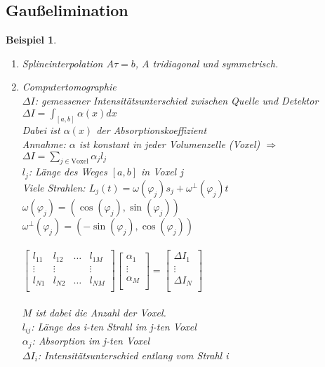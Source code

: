 \documentclass[12pt]{article}
\theoremstyle{break}
\newtheorem{example}[theorem]{Beispiel}
\begin{document}
\subsection{Gaußelimination}
%
\begin{example}\leavevmode
\begin{enumerate}
  \item[a)] Splineinterpolation $A\tau = b$, $A$ tridiagonal und symmetrisch.
  \item[b)] Computertomographie \\
    $\Delta I$: gemessener Intensitätsunterschied zwischen Quelle und Detektor \\
    $\Delta I = \int_{[a,b]} \alpha(x) dx$\\
    Dabei ist $\alpha(x)$ der Absorptionskoeffizient\\
    Annahme: $\alpha$ ist konstant in jeder Volumenzelle (Voxel) $\Rightarrow$\\
    $\Delta I = \sum_{j \in \text{Voxel}} \alpha_j l_j$\\
    $l_j$: Länge des Weges $[a,b]$ in Voxel $j$\\
    Viele Strahlen: $L_j(t) = \omega ( \varphi_j ) s_j + \omega^{\perp} ( \varphi_j ) t$\\
    $\omega(\varphi_j) = (\cos(\varphi_j), \sin(\varphi_j))$\\
    $\omega^{\perp}(\varphi_j) = (-\sin(\varphi_j), \cos(\varphi_j))$ \\\\
    $\begin{bmatrix} 
    l_{11} & l_{12} & \dots & l_{1M} \\
    \vdots & \vdots & & \vdots \\
    l_{N1} & l_{N2} & \dots & l_{NM} \\
    \end{bmatrix}
    \begin{bmatrix}
    \alpha_1 \\
    \vdots \\
    \alpha_M \\
    \end{bmatrix}
    =
    \begin{bmatrix}
    \Delta I_1 \\
    \vdots \\
    \Delta I_N \\
    \end{bmatrix}$\\\\
    $M$ ist dabei die Anzahl der Voxel.\\
    $l_{ij}$: Länge des i-ten Strahl im j-ten Voxel\\
    $\alpha_j$: Absorption im j-ten Voxel \\
    $\Delta I_i$: Intensitätsunterschied entlang vom Strahl i
\end{enumerate}
\end{example}
\end{document}
